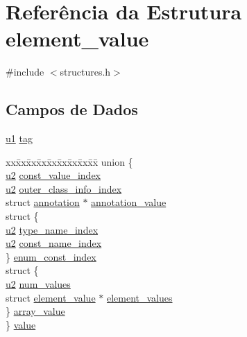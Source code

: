 \hypertarget{structelement__value}{}\section{Referência da Estrutura element\+\_\+value}
\label{structelement__value}


{\ttfamily \#include $<$structures.\+h$>$}

\subsection*{Campos de Dados}
\begin{DoxyCompactItemize}
\item 
\hyperlink{lista__operandos_8h_ad9f4cdb6757615aae2fad89dab3c5470}{u1} \hyperlink{structelement__value_a2664460cf3cbd50f7116dcc6fc5dc049}{tag}
\item 
\begin{tabbing}
xx\=xx\=xx\=xx\=xx\=xx\=xx\=xx\=xx\=\kill
union \{\\
\>\hyperlink{lista__operandos_8h_a732cde1300aafb73b0ea6c2558a7a54f}{u2} \hyperlink{structelement__value_a8ba1271c398c892dcfc93197244c1a50}{const\_value\_index}\\
\>\hyperlink{lista__operandos_8h_a732cde1300aafb73b0ea6c2558a7a54f}{u2} \hyperlink{structelement__value_a194379118d41c95cec886acb9c4b9d02}{outer\_class\_info\_index}\\
\>struct \hyperlink{structannotation}{annotation} $\ast$ \hyperlink{structelement__value_af583fbf558e5dd08ffee4323d7f86fe9}{annotation\_value}\\
\>struct \{\\
\>\>\hyperlink{lista__operandos_8h_a732cde1300aafb73b0ea6c2558a7a54f}{u2} \hyperlink{structelement__value_ad1925807cc4b5a79fa7fa56d46462ecb}{type\_name\_index}\\
\>\>\hyperlink{lista__operandos_8h_a732cde1300aafb73b0ea6c2558a7a54f}{u2} \hyperlink{structelement__value_a44ed4ad39e3d38535f06cd844a86ad80}{const\_name\_index}\\
\>\} \hyperlink{structelement__value_abd757c88db2597823aed354328707ae6}{enum\_const\_index}\\
\>struct \{\\
\>\>\hyperlink{lista__operandos_8h_a732cde1300aafb73b0ea6c2558a7a54f}{u2} \hyperlink{structelement__value_adcb3c2aa2aeef9f3c78b25162e99274e}{num\_values}\\
\>\>struct \hyperlink{structelement__value}{element\_value} $\ast$ \hyperlink{structelement__value_a1bb47f79171a2bd7a6efb5d5b4882c49}{element\_values}\\
\>\} \hyperlink{structelement__value_ad8b56bf5bc16d7e5285ced8e4e33e30b}{array\_value}\\
\} \hyperlink{structelement__value_a4d0a32ca39ecb90de9af608585c10054}{value}\\

\end{tabbing}\end{DoxyCompactItemize}


